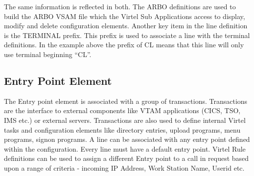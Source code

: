 \documentclass[letterpaper,10pt,english]{sphinxmanual}
\begin{document}
\begin{sphinxVerbatim}[commandchars=\\\{\}]
                                          
                                          
                                         
                
                                            
                                         
                                              
                                                
                                       
                                           
                                               
                                             
                                             
\end{sphinxVerbatim}

The same information is reflected in both. The ARBO definitions are used to build the ARBO VSAM file which the Virtel Sub Applications access to display, modify and delete configuration elements. Another key item in the line definition is the TERMINAL prefix. This prefix is used to associate a line with the terminal definitions. In the example above the prefix of CL means that this line will only use terminal beginning “CL”.


\subsection{Entry Point Element}
\label{\detokenize{connectivity_guide:entry-point-element}}
The Entry point element is associated with a group of transactions. Transactions are the interface to external components like VTAM applications (CICS, TSO, IMS etc.) or external servers. Transactions are also used to define internal Virtel tasks and configuration elements like directory entries, upload programs, menu programs, signon programs. A line can be associated with any entry point defined within the configuration. Every line must have a default entry point. Virtel Rule definitions can be used to assign a different Entry point to a call in request based upon a range of criteria - incoming IP Address, Work Station Name, Userid etc.
\end{document}
